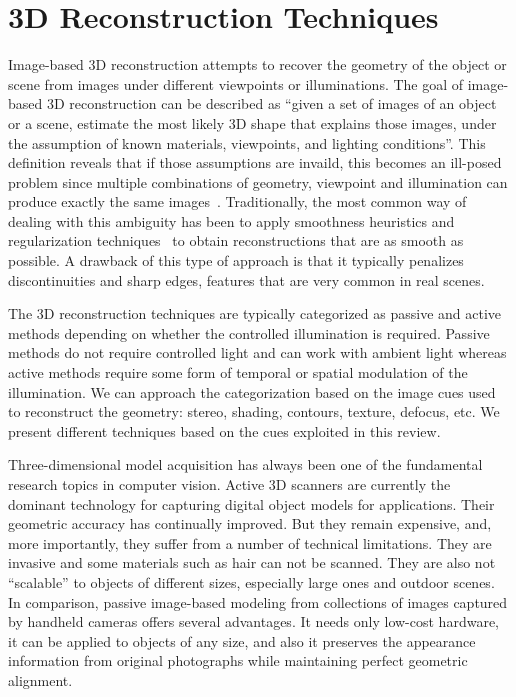 \section{3D Reconstruction Techniques}
\label{sec:3DRecon_Tech}
Image-based 3D reconstruction attempts to recover the geometry of the object or scene from images under different viewpoints or illuminations. The goal of image-based 3D reconstruction can be described as ``given a set of images of an object or a scene, estimate the most likely 3D shape that explains those images, under the assumption of known materials, viewpoints, and lighting conditions''. This definition reveals that if those assumptions are invaild, this becomes an ill-posed problem since multiple combinations of geometry, viewpoint and illumination can produce exactly the same images~\cite{poggio1985computational}. Traditionally, the most common way of dealing with this ambiguity has been to apply smoothness heuristics and regularization techniques~\cite{poggio1985computational} to obtain reconstructions that are as smooth as possible. A drawback of this type of approach is that it typically penalizes discontinuities and sharp edges, features that are very common in real scenes.

The 3D reconstruction techniques are typically categorized as passive and active methods depending on whether the controlled illumination is required. Passive methods do not require controlled light and can work with ambient light whereas active methods require some form of temporal or spatial modulation of the illumination. We can approach the categorization based on the image cues used to reconstruct the geometry: stereo, shading, contours, texture, defocus, etc. We present different techniques based on the cues exploited in this review.

Three-dimensional model acquisition has always been one of the fundamental research topics in computer vision. Active 3D scanners are currently the dominant technology for capturing digital object models for applications. Their geometric accuracy has continually improved. But they remain expensive, and, more importantly, they suffer from a number of technical limitations. They are invasive and some materials such as hair can not be scanned. They are also not ``scalable'' to objects of different sizes, especially large ones and outdoor scenes. In comparison, passive image-based modeling from collections of images captured by handheld cameras offers several advantages. It needs only low-cost hardware, it can be applied to objects of any size, and also it preserves the appearance information from original photographs while maintaining perfect geometric alignment.

